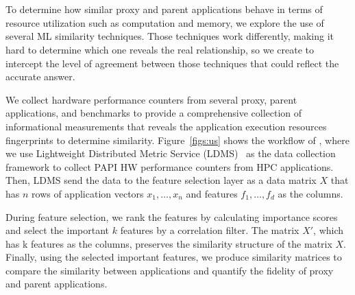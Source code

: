 \section{\us}
\label{sec:simEngine}
To determine how similar proxy and parent applications behave in terms of resource utilization such as computation and memory, we explore the use of several ML similarity techniques. Those techniques work differently, making it hard to determine which one reveals the real relationship, so we create \us to intercept the level of agreement between those techniques that could reflect the accurate answer. 

We collect hardware performance counters from several proxy, parent applications, and benchmarks to provide a comprehensive collection of informational measurements that reveals the application execution resources fingerprints to determine similarity.  
Figure~\ref{figs:us} shows the workflow of \us, where we use Lightweight Distributed Metric Service (LDMS)~\cite{ldms_sandia} as the data collection framework to collect PAPI HW performance counters from HPC applications. Then, LDMS send the data to the feature selection layer as a data matrix $X$ that has $n$ rows of application vectors $x_{1},\ldots,x_{n}$ and features $f_{1},\ldots,f_{d}$ as the columns.


During feature selection, we rank the features by calculating importance scores and select the important $k$ features by a correlation filter.
The matrix $X'$, which has k features as the columns, preserves the similarity structure of the matrix $X$. 
Finally, using the selected important features, we produce similarity matrices to compare the similarity between applications and quantify the fidelity of proxy and parent applications. 

